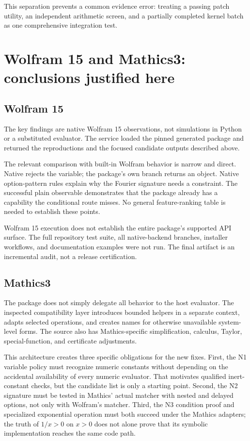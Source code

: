 \documentclass[11pt,letterpaper]{article}
\newcommand{\code}[1]{\texttt{\detokenize{#1}}}
\begin{document}
This separation prevents a common evidence error: treating a passing patch utility, an independent arithmetic screen, and a partially completed kernel batch as one comprehensive integration test.

\section{Wolfram 15 and Mathics3: conclusions justified here}
\label{sec:runtimes}

\subsection{Wolfram 15}

The key findings are native Wolfram 15 observations, not simulations in Python or a substituted evaluator. The service loaded the pinned generated package and returned the reproductions and the focused candidate outputs described above.

The relevant comparison with built-in Wolfram behavior is narrow and direct. Native \code{Series} rejects the \code{Pi} variable; the package's own branch returns an object. Native option-pattern rules explain why the Fourier signature needs a constraint. The successful plain observable demonstrates that the package already has a capability the conditional route misses. No general feature-ranking table is needed to establish these points.\cite{wlseries,wloptions,wloptional}

Wolfram 15 execution does not establish the entire package's supported API surface. The full repository test suite, all native-backend branches, installer workflows, and documentation examples were not run. The final artifact is an incremental audit, not a release certification.

\subsection{Mathics3}

The package does not simply delegate all behavior to the host evaluator. The inspected compatibility layer introduces bounded helpers in a separate context, adapts selected operations, and creates names for otherwise unavailable system-level forms. The source also has Mathics-specific simplification, calculus, Taylor, special-function, and certificate adjustments.\cite{mathicscompat,mathicssimplification,mathicstaylor,mathicscalc,mathicsspecial}

This architecture creates three specific obligations for the new fixes. First, the N1 variable policy must recognize numeric constants without depending on the accidental availability of every numeric evaluator. That motivates qualified inert-constant checks, but the candidate list is only a starting point. Second, the N2 signature must be tested in Mathics' actual matcher with nested and delayed options, not only with Wolfram's matcher. Third, the N3 condition proof and specialized exponential operation must both succeed under the Mathics adapters; the truth of $1/x>0$ on $x>0$ does not alone prove that its symbolic implementation reaches the same code path.
\end{document}
